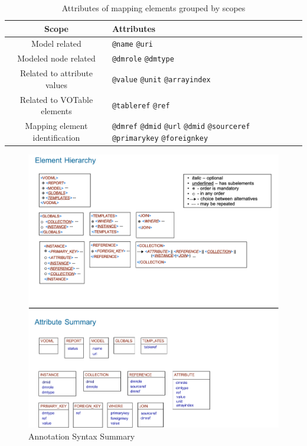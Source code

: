 \begin{table}[!htbp]
\small
\centering
\begin{tabulary}{\linewidth}{|c|J|}       
       \hline 
            \textbf{Scope} & 
            \textbf {Attributes}\\
       \hline         
       \hline  
             Model related & 
             \texttt{@name} \texttt{@uri} \\
       \hline  
             Modeled node related & 
             \texttt{@dmrole} \texttt{@dmtype} \\
       \hline  
             Related to attribute values & 
             \texttt{@value} \texttt{@unit} \texttt{@arrayindex} \\
       \hline  
             Related to VOTable elements & 
             \texttt{@tableref} \texttt{@ref} \\
       \hline  
             Mapping element identification& 
             \texttt{@dmref} \texttt{@dmid} \texttt{@url} \texttt{@dmid} \texttt{@sourceref} \texttt{@primarykey} \texttt{@foreignkey} \\
       \hline
     \end{tabulary}
     \caption{Attributes of mapping elements grouped by scopes} 
     \label{tbl:syntax-att}
 \end{table}
 
 


  \begin{figure}[h]
    \begin{center}
      \includegraphics[width=1.2\textwidth]{mivot-summary.png}
      \caption{Annotation Syntax Summary}
      \label{fig:summary}
    \end{center}
  \end{figure}
